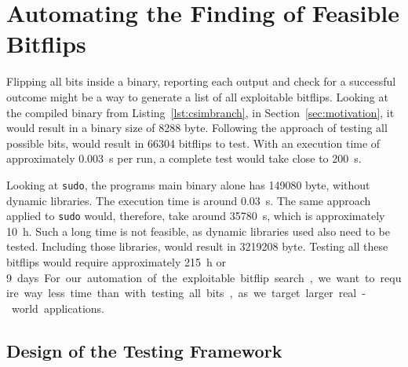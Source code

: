 \section{Automating the Finding of Feasible Bitflips}

Flipping all bits inside a binary, reporting each output and check for a
successful outcome might be a way to generate a list of all exploitable
bitflips. Looking at the compiled binary from Listing~\ref{lst:csimbranch}, in
Section~\ref{sec:motivation}, it would result in a binary size
of \num{8288} byte. Following the approach of testing all possible bits, would
result in \num{66304} bitflips to test. With an execution time of approximately
\SI{0.003}{\second} per run, a complete test would take close to
\SI{200}{\second}.

Looking at \texttt{sudo}, the program\textquotesingle s main binary
alone has \num{149080} byte, without dynamic libraries. The execution
time is around \SI{0.03}{\second}. The same approach applied to \texttt{sudo}
would, therefore, take around \SI{35780}{\second}, which is approximately
\SI{10}{\hour}. Such a long time is not feasible, as dynamic libraries used
also need to be tested. Including those libraries, would result in
\num{3219208} byte. Testing all these bitflips would require
approximately \SI{215}{\hour} or \SI{9} days.

For our automation of the exploitable bitflip search, we want to require way
less time than with testing all bits, as we target larger real-world
applications.

\subsection{Design of the Testing Framework}

